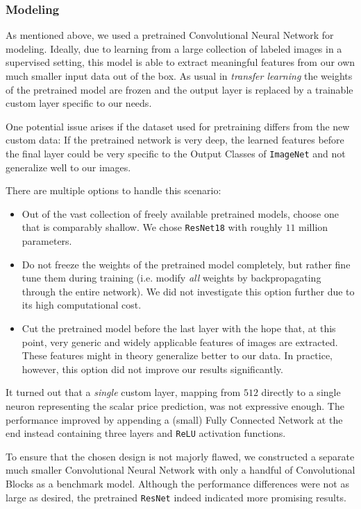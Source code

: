 \documentclass[12pt, letterpaper]{article}
\begin{document}
\subsubsection{Modeling}

As mentioned above, we used a pretrained Convolutional Neural Network for modeling.
Ideally, due to learning from a large collection of labeled images in a supervised setting, this model is able to extract meaningful features from our own much smaller input data out of the box.
As usual in \emph{transfer learning} the weights of the pretrained model are frozen and the output layer is replaced by a trainable custom layer specific to our needs.

One potential issue arises if the dataset used for pretraining differs from the new custom data:
If the pretrained network is very deep, the learned features before the final layer could be very specific to the Output Classes of \texttt{ImageNet} and not generalize well to our images.

There are multiple options to handle this scenario:
\begin{itemize}
    \item Out of the vast collection of freely available pretrained models, choose one that is comparably shallow.
          We chose \texttt{ResNet18} with roughly $11$ million parameters.
    \item Do not freeze the weights of the pretrained model completely, but rather fine tune them during training (i.e. modify \emph{all} weights by backpropagating through the entire network).
          We did not investigate this option further due to its high computational cost.
    \item Cut the pretrained model before the last layer with the hope that, at this point, very generic and widely applicable features of images are extracted.
          These features might in theory generalize better to our data.
          In practice, however, this option did not improve our results significantly.
\end{itemize}

It turned out that a \emph{single} custom layer, mapping from $512$ directly to a single neuron representing the scalar price prediction, was not expressive enough.
The performance improved by appending a (small) Fully Connected Network at the end instead containing three layers and \texttt{ReLU} activation functions.

To ensure that the chosen design is not majorly flawed, we constructed a separate much smaller Convolutional Neural Network with only a handful of Convolutional Blocks as a benchmark model.
Although the performance differences were not as large as desired, the pretrained \texttt{ResNet} indeed indicated more promising results.
\end{document}
